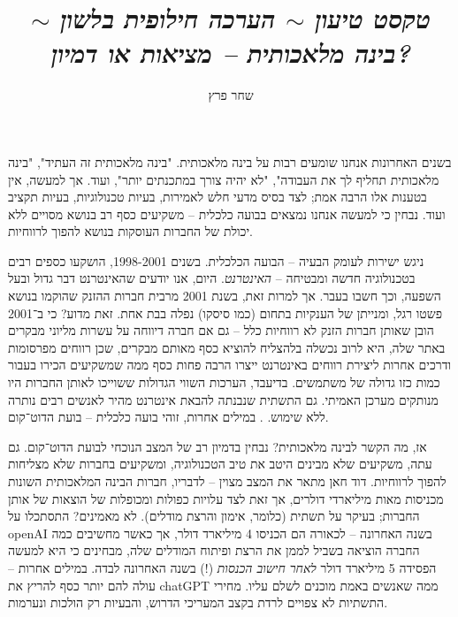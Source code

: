 \documentclass[]{article}
\author{שחר פרץ}
\title{\textit{טקסט טיעון $\sim$ הערכה חילופית בלשון $\sim$ בינה מלאכותית – מציאות או דמיון? }}
\theoremstyle{definition}
\begin{document}
	\maketitle
	בשנים האחרונות אנחנו שומעים רבות על בינה מלאכותית. "בינה מלאכותית זה העתיד", "בינה מלאכותית תחליף לך את העבודה", "לא יהיה צורך במתכנתים יותר", ועוד. אך למעשה, אין בטענות אלו הרבה אמת; לצד בסיס מדעי חלש לאמירות, בעיות טכנולוגיות, בעיות תקציב ועוד. נבחין כי למעשה אנחנו נמצאים בבועה כלכלית – משקיעים כסף רב בנושא מסויים ללא יכולת של החברות העוסקות בנושא להפוך לרווחיות. 
	
	ניגש ישירות לעומק הבעיה – הבועה הכלכלית. בשנים 1998-2001, הושקעו כספים רבים בטכנולוגיה חדשה ומבטיחה – \textit{האינטרנט}. היום, אנו יודעים שהאינטרנט דבר גדול ובעל השפעה, וכך חשבו בעבר. אך למרות זאת, בשנת 2001 מרבית חברות ההזנק שהוקמו בנושא פשטו רגל, ומנייתן של הענקיות בתחום (כמו סיסקו) נפלה בבת אחת. זאת מדוע? כי ב־2001 הובן שאותן חברות הזנק לא רווחיות כלל – גם אם חברה דיווחה על עשרות מליוני מבקרים באתר שלה, היא לרוב נכשלה בלהצליח להוציא כסף מאותם מבקרים, שכן רווחים מפרסומות ודרכים אחרות ליצירת רווחים באינטרנט ייצרו הרבה פחות כסף ממה שמשקיעים הכירו בעבור כמות כזו גדולה של משתמשים. בדיעבד, הערכות השווי הגדולות ששוייכו לאותן החברות היו מנותקים מערכן האמיתי. גם התשתית שנבנתה להבאת אינטרנט מהיר לאנשים רבים נותרה ללא שימוש. \cite{dotnetbubble}. במילים אחרות, זוהי בועה כלכלית – בועת הדוט־קום. 
	
	אז, מה הקשר לבינה מלאכותית? נבחין בדמיון רב של המצב הנוכחי לבועת הדוט־קום. גם עתה, משקיעים שלא מבינים היטב את טיב הטכנולוגיה, ומשקיעים בחברות שלא מצליחות להפוך לרווחיות. דוד חאן מתאר את המצב מצוין \cite{GenghisKhan} – לדבריו, חברות הבינה המלאכותית השונות מכניסות מאות מיליארדי דולרים, אך זאת לצד עלויות כפולות ומכופלות של הוצאות של אותן החברות; בעיקר על תשתית (כלומר, אימון והרצת מודלים). לא מאמינים? התסתכלו על openAI בשנה האחרונה – לכאורה הם הכניסו 4 מיליארד דולר, אך כאשר מחשיבים כמה החברה הוציאה בשביל לממן את הרצת ופיתוח המודלים שלה, מבחינים כי היא למעשה הפסידה 5 מיליארד דולר \textit{לאחר חישוב הכנסות} (!) בשנה האחרונה לבדה. במילים אחרות – עולה להם יותר כסף להריץ את chatGPT ממה שאנשים באמת מוכנים לשלם עליו. מחירי התשתיות לא צפויים לרדת \cite{RIPMOORE} בקצב המעריכי הדרוש, והבעיות רק הולכות ונערמות. 
	
\end{document}
